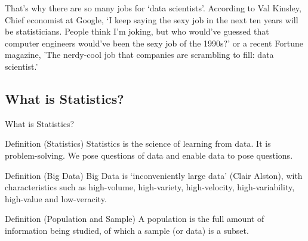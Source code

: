 \documentclass[t,xcolor=pdftex,dvipsnames,table]{beamer}
\begin{document}
\begin{frame}{}
That's why there are so many jobs for `data scientists'. According to Val Kinsley, Chief economist at Google, `I keep saying the sexy job in the next ten years will be statisticians. People think I'm joking, but who would've guessed that computer engineers would've been the sexy job of the 1990s?' or a recent Fortune magazine, 'The nerdy-cool job that companies are scrambling to fill: data scientist.'

\vspace{.5cm}
\href{https://en.wikipedia.org/wiki/Frazz}{} 
\href{http://vadlo.com/Research_Cartoons/Depends-upon-what-is-more-publishable.gif}{}
\href{https://flowingdata.com/category/statistics/mistaken-data/}{} 
\href{http://www.mckinsey.com/insights/innovation/hal_varian_on_how_the_web_challenges_managers}{}  
\href{http://www.careercast.com/jobs-rated/jobs-rated-report-2016-ranking-200-jobs}{}
\href{www.nytimes.com/2000/07/28/us/john-tukey-85-statistician-coined-the-word-software.html}{}
\href{http://www.amadeus.com/blog/18/06/10-reasons-why-data-scientist-is-the-sexiest-job-or-not/}{}
\href{http://fortune.com/2011/09/06/data-scientist-the-hot-new-gig-in-tech/}{}
\end{frame}



\subsection[]{What is Statistics?}
\begin{frame}{What is Statistics?}
\begin{block}{Definition (Statistics)}
Statistics is the science of learning from data. It is problem-solving. We pose questions of data and enable data to pose questions.
\end{block}

\begin{block}{Definition (Big Data)}
Big Data is `inconveniently large data’ (Clair Alston), with characteristics such as high-volume, high-variety, high-velocity, high-variability, high-value and low-veracity.
\end{block}

\begin{block}{Definition (Population and Sample)}
A population is the full amount of information being studied, of which a sample (or data) is a subset.
\end{block}
\end{frame}
\end{document}
